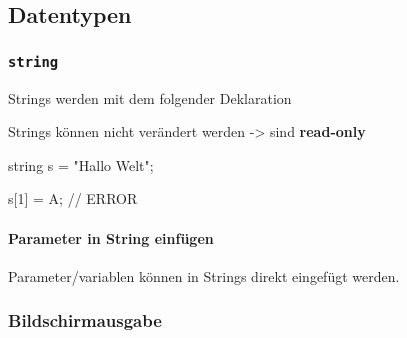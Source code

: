 \documentclass[
  10pt,
  a4paperpaper,
  DIV=11]{scrartcl}
\let\oldparagraph\paragraph
\renewcommand{\paragraph}[1]{\oldparagraph{#1}\mbox{}}
\newenvironment{Shaded}{}{}
\newcommand{\CharTok}[1]{\textcolor[rgb]{0.01,0.18,0.38}{#1}}
\newcommand{\CommentTok}[1]{\textcolor[rgb]{0.42,0.45,0.49}{#1}}
\newcommand{\DataTypeTok}[1]{\textcolor[rgb]{0.84,0.23,0.29}{#1}}
\newcommand{\DecValTok}[1]{\textcolor[rgb]{0.00,0.36,0.77}{#1}}
\newcommand{\NormalTok}[1]{\textcolor[rgb]{0.14,0.16,0.18}{#1}}
\newcommand{\OperatorTok}[1]{\textcolor[rgb]{0.14,0.16,0.18}{#1}}
\newcommand{\StringTok}[1]{\textcolor[rgb]{0.01,0.18,0.38}{#1}}
\numberwithin{equation}{section}
\begin{document}
\hypertarget{datentypen}{%
\subsection{Datentypen}\label{datentypen}}

\hypertarget{string}{%
\subsubsection{\texorpdfstring{\texttt{string}}{string}}\label{string}}

Strings werden mit dem folgender Deklaration

\begin{tcolorbox}[enhanced jigsaw, coltitle=black, colbacktitle=quarto-callout-important-color!10!white, opacityback=0, colframe=quarto-callout-important-color-frame, arc=.35mm, breakable, toprule=.15mm, rightrule=.15mm, titlerule=0mm, bottomtitle=1mm, colback=white, toptitle=1mm, title=\textcolor{quarto-callout-important-color}{\faExclamation}\hspace{0.5em}{Wichtig}, bottomrule=.15mm, leftrule=.75mm, opacitybacktitle=0.6, left=2mm]

Strings können nicht verändert werden -\textgreater{} sind
\textbf{read-only}

\begin{Shaded}
\begin{Highlighting}[]
\DataTypeTok{string}\NormalTok{ s }\OperatorTok{=} \StringTok{"Hallo Welt"}\OperatorTok{;}

\NormalTok{s}\OperatorTok{[}\DecValTok{1}\OperatorTok{]} \OperatorTok{=} \CharTok{\textquotesingle{}A\textquotesingle{}}\OperatorTok{;} \CommentTok{// ERROR}
\end{Highlighting}
\end{Shaded}

\end{tcolorbox}

\hypertarget{parameter-in-string-einfuxfcgen}{%
\paragraph{Parameter in String
einfügen}\label{parameter-in-string-einfuxfcgen}}

Parameter/variablen können in Strings direkt eingefügt werden.

\hypertarget{bildschirmausgabe}{%
\subsubsection{Bildschirmausgabe}\label{bildschirmausgabe}}
\end{document}
